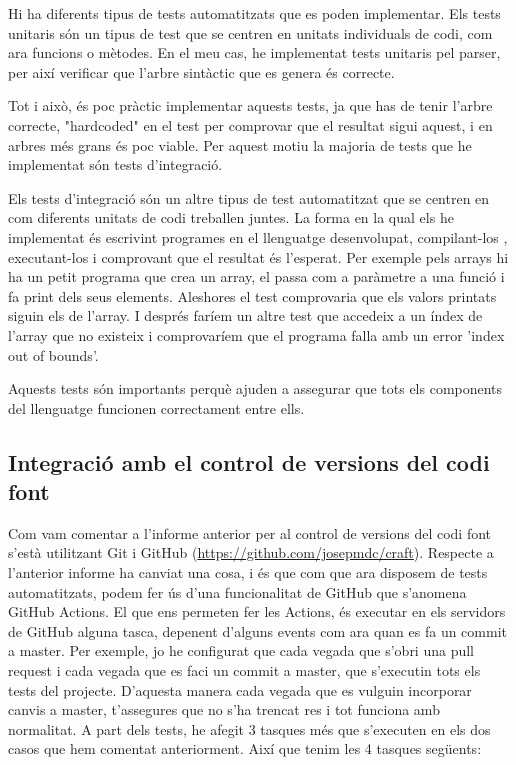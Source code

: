 ﻿\documentclass{article}
\begin{document}
Hi ha diferents tipus de tests automatitzats que es poden implementar. Els tests
unitaris són un tipus de test que se centren en unitats individuals de codi, com
ara funcions o mètodes. En el meu cas, he implementat tests unitaris pel parser,
per així verificar que l'arbre sintàctic que es genera és correcte. 

Tot i això, és poc pràctic implementar aquests tests, ja que has de tenir
l'arbre correcte, "hardcoded" en el test per comprovar que el resultat sigui
aquest, i en arbres més grans és poc viable. Per aquest motiu la majoria de
tests que he implementat són tests d'integració.

Els tests d'integració són un altre tipus de test automatitzat que se centren en
com diferents unitats de codi treballen juntes. La forma en la qual els he 
implementat és escrivint programes en el llenguatge desenvolupat, compilant-los 
, executant-los i comprovant que el resultat és l'esperat. Per exemple pels 
arrays hi ha un petit programa que crea un array, el passa com a paràmetre a una
funció i fa print dels seus elements. Aleshores el test comprovaria que els 
valors printats siguin els de l'array. I després faríem un altre test que 
accedeix a un índex de l'array que no existeix i comprovaríem que el programa 
falla amb un error 'index out of bounds'.

Aquests tests són importants perquè ajuden a assegurar que tots els components
del llenguatge funcionen correctament entre ells.

\subsection{Integració amb el control de versions del codi font}

Com vam comentar a l'informe anterior per al control de versions del codi font
s'està utilitzant Git i GitHub (\url{https://github.com/josepmdc/craft}).
Respecte a l'anterior informe ha canviat una cosa, i és que com que ara disposem
de tests automatitzats, podem fer ús d'una funcionalitat de GitHub que s'anomena
GitHub Actions. El que ens permeten fer les Actions, és executar en els
servidors de GitHub alguna tasca, depenent d'alguns events com ara quan es fa un
commit a master. Per exemple, jo he configurat que cada vegada que s'obri una
pull request i cada vegada que es faci un commit a master, que s'executin tots
els tests del projecte. D'aquesta manera cada vegada que es vulguin incorporar
canvis a master, t'assegures que no s'ha trencat res i tot funciona amb
normalitat. A part dels tests, he afegit 3 tasques més que s'executen en els 
dos casos que hem comentat anteriorment. Així que tenim les 4 tasques següents:
\end{document}
